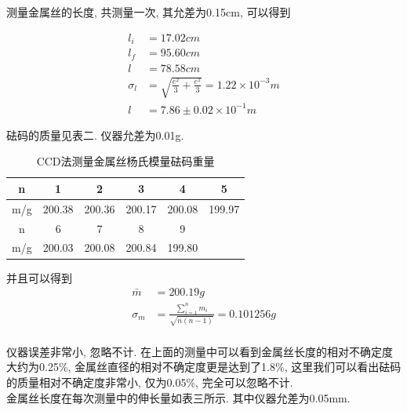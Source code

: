 \documentclass[a4paper,10pt,notitlepage]{article}
\begin{document}
	测量金属丝的长度, 共测量一次, 其允差为0.15cm, 可以得到
	
\begin{align*}
	l_i &= 17.02 cm \\
	l_f &= 95.60 cm \\
	l &= 78.58 cm \\
	\sigma_l &= \sqrt{\frac{e^2}{3} + \frac{e^2}{3}} = 1.22 \times 10^{-3} m \\
	l &= 7.86 \pm 0.02 \times 10 ^ {-1} m
\end{align*}

	砝码的质量见表二. 仪器允差为0.01g. \\
	
\begin{center}

	\begin{longtable}{|c|c|c|c|c|c|}
	\caption{CCD法测量金属丝杨氏模量砝码重量}\\
	\hline
	n & 1 & 2 & 3 & 4 & 5 \\
	\hline
	m/g & 200.38 & 200.36 & 200.17 & 200.08 & 199.97 \\
	\hline
	\hline
	n & 6 & 7 & 8 & 9 &  \\
	\hline
	m/g & 200.03 & 200.08 & 200.84 & 199.80 &  \\
	\hline
	\end{longtable}

\end{center}

	并且可以得到 \\

\begin{align*}
	\bar{m} &= 200.19 g \\
	\sigma_m &= \frac{\sum_{i = 1}^{n}m_i}{\sqrt{n(n-1)}} = 0.101256 g \\
\end{align*}

	仪器误差非常小, 忽略不计. 在上面的测量中可以看到金属丝长度的相对不确定度大约为0.25\%, 金属丝直径的相对不确定度更是达到了1.8\%, 这里我们可以看出砝码的质量相对不确定度非常小, 仅为0.05\%, 完全可以忽略不计. \\
	
	金属丝长度在每次测量中的伸长量如表三所示. 其中仪器允差为0.05mm. \\
	
\end{document}
